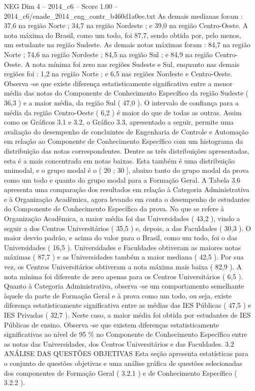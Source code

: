 \begin{textsample}{NEG Dim 4 – 2014\_c6 – Score 1.00 – 2014\_c6/enade\_2014\_eng\_contr\_b460d1a0ee.txt}
As demais medianas foram : 37,6 na região Norte ; 34,7 na região Nordeste ; e 39,0 na região Centro-Oeste.
A nota máxima do Brasil, como um todo, foi 87,7, sendo obtida por, pelo menos, um estudante na região Sudeste.
As demais notas máximas foram : 84,7 na região Norte ; 74,6 na região Nordeste ; 84,5 na região Sul ; e 84,9 na região Centro-Oeste.
A nota mínima foi zero nas regiões Sudeste e Sul, enquanto nas demais regiões foi : 1,2 na região Norte ; e 6,5 nas regiões Nordeste e Centro-Oeste.
Observa -se que existe diferença estatisticamente significativa entre a menor média das notas do Componente de Conhecimento Específico da região Sudeste ( 36,3 ) e a maior média, da região Sul ( 47,0 ).
O intervalo de confiança para a média da região Centro-Oeste ( 6,2 ) é maior do que de todas as outras.
Assim como os Gráficos 3.1 e 3.2, o Gráfico 3.3, apresentado a seguir, permite uma avaliação do desempenho de concluintes de Engenharia de Controle e Automação em relação ao Componente de Conhecimento Específico com um histograma da distribuição das notas correspondentes.
Dentre as três distribuições apresentadas, esta é a mais concentrada em notas baixas.
Esta também é uma distribuição unimodal, e o grupo modal é o ( 20 ; 30 ], abaixo tanto do grupo modal da prova como um todo e quanto do grupo modal para a Formação Geral.
A Tabela 3.6 apresenta uma comparação dos resultados em relação à Categoria Administrativa e à Organização Acadêmica, agora levando em conta o desempenho de estudantes do Componente de Conhecimento Específico da prova.
No que se refere à Organização Acadêmica, a maior média foi das Universidades ( 43,2 ), vindo a seguir a dos Centros Universitários ( 35,5 ) e, depois, a das Faculdades ( 30,3 ).
O maior desvio padrão, e acima do valor para o Brasil, como um todo, foi o das Universidades ( 16,5 ).
Universidades e Faculdades obtiveram as maiores notas máximas ( 87,7 ) e as Universidades também a maior mediana ( 42,5 ).
Por sua vez, os Centros Universitários obtiveram a nota máxima mais baixa ( 82,9 ).
A nota mínima foi diferente de zero apenas para os Centros Universitários ( 6,5 ).
Quanto à Categoria Administrativa, observa -se um comportamento semelhante àquele da parte de Formação Geral e à prova como um todo, ou seja, existe diferença estatisticamente significativa entre as médias das IES Públicas ( 47,5 ) e IES Privadas ( 32,7 ).
Neste caso, a maior média foi obtida por estudantes de IES Públicas de ensino.
Observa -se que existem diferenças estatisticamente significativas ao nível de 95 \% no Componente de Conhecimento Específico entre as notas das Universidades, dos Centros Universitários e das Faculdades. 3.2 ANÁLISE DAS QUESTÕES OBJETIVAS Esta seção apresenta estatísticas para o conjunto de questões objetivas e uma análise gráfica de questões selecionadas dos componentes de Formação Geral ( 3.2.1 ) e de Conhecimento Específico ( 3.2.2 ).

\end{textsample}
